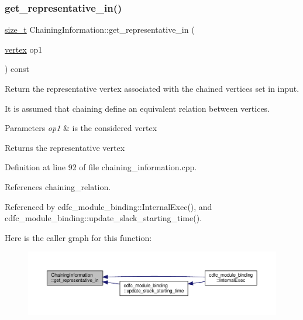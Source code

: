 \subsubsection{\texorpdfstring{get\+\_\+representative\+\_\+in()}{get\_representative\_in()}}
{\footnotesize\ttfamily \hyperlink{tutorial__fpt__2017_2intro_2sixth_2test_8c_a7c94ea6f8948649f8d181ae55911eeaf}{size\+\_\+t} Chaining\+Information\+::get\+\_\+representative\+\_\+in (\begin{DoxyParamCaption}\item[{\hyperlink{graph_8hpp_abefdcf0544e601805af44eca032cca14}{vertex}}]{op1 }\end{DoxyParamCaption}) const}



Return the representative vertex associated with the chained vertices set in input. 

It is assumed that chaining define an equivalent relation between vertices. 
\begin{DoxyParams}{Parameters}
{\em op1} & is the considered vertex \\
\hline
\end{DoxyParams}
\begin{DoxyReturn}{Returns}
the representative vertex 
\end{DoxyReturn}


Definition at line 92 of file chaining\+\_\+information.\+cpp.



References chaining\+\_\+relation.



Referenced by cdfc\+\_\+module\+\_\+binding\+::\+Internal\+Exec(), and cdfc\+\_\+module\+\_\+binding\+::update\+\_\+slack\+\_\+starting\+\_\+time().

Here is the caller graph for this function\+:
\nopagebreak
\begin{figure}[H]
\begin{center}
\leavevmode
\includegraphics[width=350pt]{d8/d93/classChainingInformation_af6ba20747c1f89b2c18a28b85e63fb4e_icgraph}
\end{center}
\end{figure}
\mbox{\label{classChainingInformation_a55e0881a35f46688a9475fc746daf66c}} 
